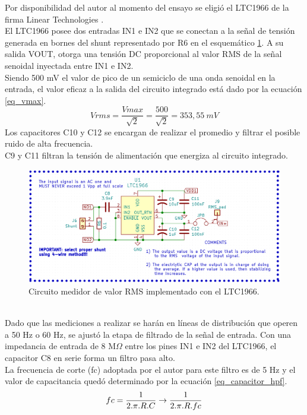 Por disponibilidad del autor al momento del ensayo se eligió el LTC1966 de la firma Linear Technologies \citep{ad636}.\\
El LTC1966 posee dos entradas IN1 e IN2 que se conectan a la señal de tensión generada en bornes del shunt representado por R6 en el esquemático \ref{fig:ctomedidorrms}. A su salida VOUT, otorga una tensión DC proporcional al valor RMS de la señal senoidal inyectada entre IN1 e IN2.\\
Siendo 500 mV el valor de pico de un semiciclo de una onda senoidal en la entrada, el valor eficaz a la salida del circuito integrado est\'{a} dado por la ecuación \ref{eq_vmax}.
\begin{equation}
	\label{eq_vmax}
	Vrms=\frac{Vmax}{\sqrt{2}}=\frac{500}{\sqrt{2}}= 353,55\  mV
\end{equation}
Los capacitores C10 y C12 se encargan de realizar el promedio y filtrar el posible ruido de alta frecuencia.\\
C9 y C11 filtran la tensión de alimentación que energiza al circuito integrado.\\
\begin{figure}[h!]
	\centering
	\includegraphics[width=1.0\linewidth]{Figures/cto_medidor_rms}
	\caption{Circuito medidor de valor RMS implementado con el LTC1966.}
	\label{fig:ctomedidorrms}
\end{figure}\\
Dado que las mediciones a realizar se harán en líneas de distribución que operen a 50 Hz o 60 Hz, se ajustó la etapa de filtrado de la señal de entrada. Con una impedancia de entrada de 8 M$\Omega$ entre los pines IN1 e IN2 del LTC1966, el capacitor C8 en serie forma un filtro pasa alto.\\
La frecuencia de corte (fc) adoptada por el autor para este filtro es de 5 Hz y el valor de capacitancia quedó determinado por la ecuación \ref{eq_capacitor_hpf}.
\begin{equation}
	fc = \frac{1}{2.\pi.R.C}\rightarrow\frac{1}{2.\pi.R.fc}\\
\end{equation}
